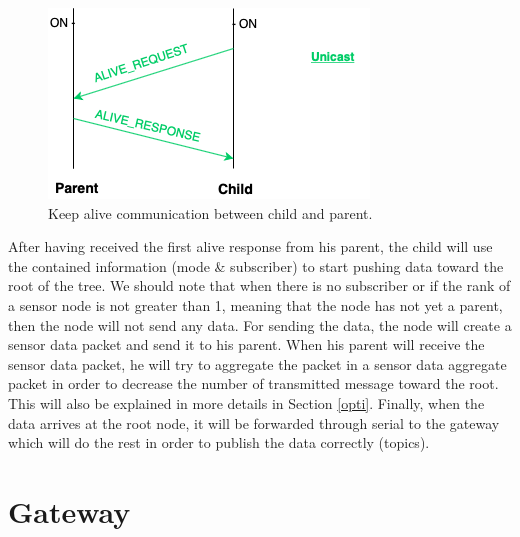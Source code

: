 \documentclass[a4paper,10pt]{article}
\begin{document}
\begin{figure}
\centering
\includegraphics[scale=0.6]{./img/alive.png}
\caption{Keep alive communication between child and parent.}
\label{fig:alive}
\end{figure}

After having received the first alive response from his parent, the child will use the contained information (mode \& subscriber) to start pushing data toward the root of the tree. We should note that when there is no subscriber or if the rank of a sensor node is not greater than 1,  meaning that the node has not yet a parent, then the node will not send any data. For sending the data, the node will create a sensor data packet and send it to his parent. When his parent will receive the sensor data packet, he will try to aggregate the packet in a sensor data aggregate packet in order to decrease the number of transmitted message toward the root. This will also be explained in more details in Section \ref{opti}. Finally, when the data arrives at the root node, it will be forwarded through serial to the gateway which will do the rest in order to publish the data correctly (topics).

\section{Gateway}
\label{gateway}
\end{document}
